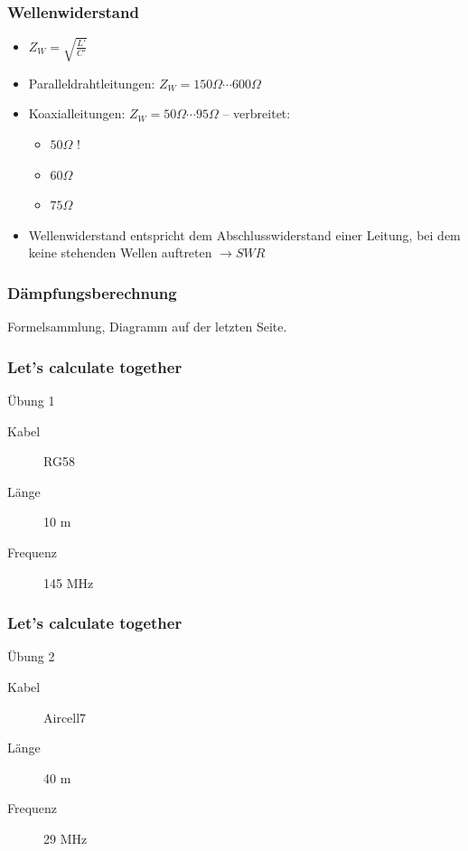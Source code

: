 \begin{frame}
\frametitle{Wellenwiderstand}
\begin{itemize}
	\item \Huge{ $Z_W = \sqrt{\frac{L'}{C'}}$}
	 \normalsize \item Paralleldrahtleitungen: $Z_W = 150 \Omega \cdots 600 \Omega$
	\item Koaxialleitungen: $Z_W =  50 \Omega \cdots 95 \Omega$ -- verbreitet:
    \begin{itemize}
        \item $50 \Omega$ !
        \item $60 \Omega$
        \item $75 \Omega$
    \end{itemize}
	\item Wellenwiderstand entspricht dem Abschlusswiderstand einer Leitung, bei
          dem keine stehenden Wellen auftreten $\rightarrow SWR$
\end{itemize}
\end{frame}

\begin{frame}
\frametitle{Dämpfungsberechnung}
\begin{Large}
Formelsammlung, Diagramm auf der letzten Seite.
\end{Large}
\end{frame}

\begin{frame}
\frametitle{Let's calculate together}
\begin{exampleblock}{Übung 1}
  \begin{description}
 	\item[Kabel] RG58
 	\item[Länge] 10 m
 	\item[Frequenz] 145 MHz
  \end{description}
\end{exampleblock}
\end{frame}

\begin{frame}
\frametitle{Let's calculate together}
\begin{exampleblock}{Übung 2}
  \begin{description}
 	\item[Kabel] Aircell7
 	\item[Länge] 40 m
 	\item[Frequenz] 29 MHz
  \end{description}
\end{exampleblock}
\end{frame}

